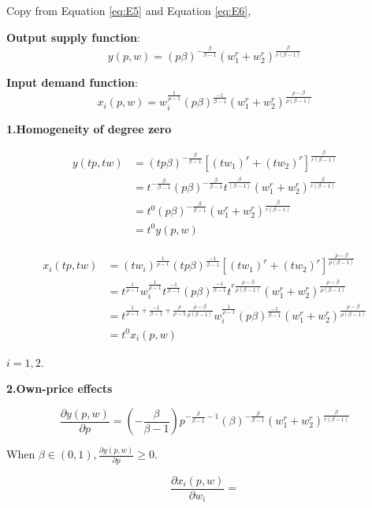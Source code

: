 \documentclass{article}
\begin{document}
Copy from Equation \ref{eq:E5}  and Equation \ref{eq:E6},

\textbf{Output supply function}:
$$
y(p,w) = (p\beta)^{-\frac{\beta}{\beta - 1}}(w_1^r + w_2^r)^{\frac{\beta}{r(\beta - 1)}}
$$

\textbf{Input demand function}:
$$
x_i(p,w) = w_i^{\frac{1}{\rho -1}}  (p\beta)^{\frac{-1}{\beta - 1}}(w_1^r + w_2^r)^{\frac{\rho -\beta}{\rho(\beta -1)}}
$$

\vspace{3mm}
\textbf{1.Homogeneity of degree zero}

\begin{align*}
y(tp,tw) &= (tp\beta)^{-\frac{\beta}{\beta - 1}}[(tw_1)^r + (tw_2)^r]^{\frac{\beta}{r(\beta - 1)}} \\
 &= t^{-\frac{\beta}{\beta - 1}}(p\beta)^{-\frac{\beta}{\beta - 1}} t^{\frac{\beta}{(\beta - 1)}} (w_1^r + w_2^r)^{\frac{\beta}{r(\beta - 1)}} \\
 &=t^0(p\beta)^{-\frac{\beta}{\beta - 1}}(w_1^r + w_2^r)^{\frac{\beta}{r(\beta - 1)}} \\
  &=t^0 y(p,w) 
\end{align*}

\begin{align*}
x_i(tp,tw) &= (tw_i)^{\frac{1}{\rho -1}}  (tp\beta)^{\frac{-1}{\beta - 1}}[(tw_1)^r + (tw_2)^r]^{\frac{\rho -\beta}{\rho(\beta -1)}} \\
&= t^{\frac{1}{\rho -1}} w_i^{\frac{1}{\rho -1}} t^{\frac{-1}{\beta -1}} (p\beta)^{\frac{-1}{\beta - 1}} t^{r\frac{\rho -\beta}{\rho(\beta -1)}} (w_1^r + w_2^r)^{\frac{\rho -\beta}{\rho(\beta -1)}} \\
 &=t^{\frac{1}{\rho -1} + \frac{-1}{\beta -1} + \frac{\rho}{\rho - 1}\frac{\rho -\beta}{\rho(\beta -1)}} w_i^{\frac{1}{\rho -1}}  (p\beta)^{\frac{-1}{\beta - 1}}(w_1^r + w_2^r)^{\frac{\rho -\beta}{\rho(\beta -1)}} \\
  &=t^0 x_i(p,w)
\end{align*}

$i = 1,2$.


\vspace{3mm}
\textbf{2.Own-price effects}

$$\frac{\partial y(p,w)}{\partial p} =(-\frac{\beta}{\beta - 1})p^{-\frac{\beta}{\beta - 1} - 1} (\beta)^{-\frac{\beta}{\beta - 1}}(w_1^r + w_2^r)^{\frac{\beta}{r(\beta - 1)}}$$

When $\beta \in (0,1), \frac{\partial y(p,w)}{\partial p} \ge 0$.


$$\frac{\partial x_i(p,w)}{\partial w_i} =
$$
\end{document}
